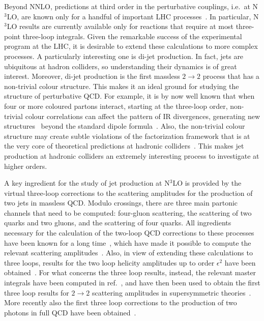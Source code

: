Beyond NNLO, predictions at third order in the
perturbative couplings, i.e.\ at N$^3$LO, are
known only for a handful of important LHC processes~\cite{Anastasiou:2015vya,Duhr:2019kwi,
Dulat:2018bfe,Mistlberger:2018etf,Dreyer:2016oyx,Dreyer:2018qbw,
Billis:2021ecs,Chen:2021isd,Chen:2021vtu}. 
In particular, N$^3$LO results are currently available only for reactions that
require at most three-point three-loop integrals.
Given the remarkable success of the
experimental program at the LHC, it is desirable to extend these
calculations to more complex processes. A particularly interesting
one is di-jet production.  In fact, jets are ubiquitous at
hadron colliders, so understanding their dynamics is of great
interest.
Moreover, di-jet production is the first massless $2\to2$
process that has a non-trivial colour structure. This makes it an
ideal ground for studying the structure of perturbative QCD. For
example, it is by now well known that when four or more coloured
partons interact, starting at the three-loop order, non-trivial
colour correlations can affect the pattern of IR divergences,
generating new structures~\cite{Almelid:2015jia} beyond the standard dipole
formula~\cite{Sterman:2002qn,Aybat:2006wq,Aybat:2006mz,Becher:2009cu,Gardi:2009qi,Becher:2009qa,Dixon:2009gx}. Also, the
non-trivial colour structure may create subtle violations of the
factorization framework that is at the very core of theoretical
predictions at hadronic
colliders~\cite{Catani:2011st,Forshaw:2012bi,Forshaw:2006fk,Becher:2021zkk}.
This makes jet production at hadronic colliders an extremely interesting
process to investigate at higher orders. 

A key ingredient for the study of jet production at N$^3$LO is
provided by the virtual three-loop corrections to the scattering
amplitudes for the production of two jets in massless QCD.  Modulo
crossings, there are three main partonic channels that need to be
computed: four-gluon scattering, the scattering of two quarks and two
gluons, and the scattering of four quarks.  All ingredients necessary
for the calculation of the two-loop QCD corrections to these processes have
been known for a long time~\cite{Smirnov:1999gc,Tausk:1999vh,Glover:2001af,Anastasiou:2002zn,Glover:2003cm}, which 
have made it possible to compute the relevant scattering amplitudes~\cite{Anastasiou:2000kg,Bern:2003ck,Glover:2004si,DeFreitas:2004kmi}. Also, in view of extending these
calculations to three loops, results for the two loop helicity
amplitudes up to order $\epsilon^2$ have been
obtained~\cite{Ahmed:2019qtg}.  For what concerns the three loop
results, instead, the relevant master integrals have been computed in
ref.~\cite{Henn:2020lye}, and have then been used to obtain the first
three loop results for $2 \to 2$ scattering amplitudes in
supersymmetric theories~\cite{Henn:2016jdu,Henn:2019rgj}.  More
recently also the first three loop corrections to the production of
two photons in full QCD have been obtained~\cite{Caola:2020dfu}.

